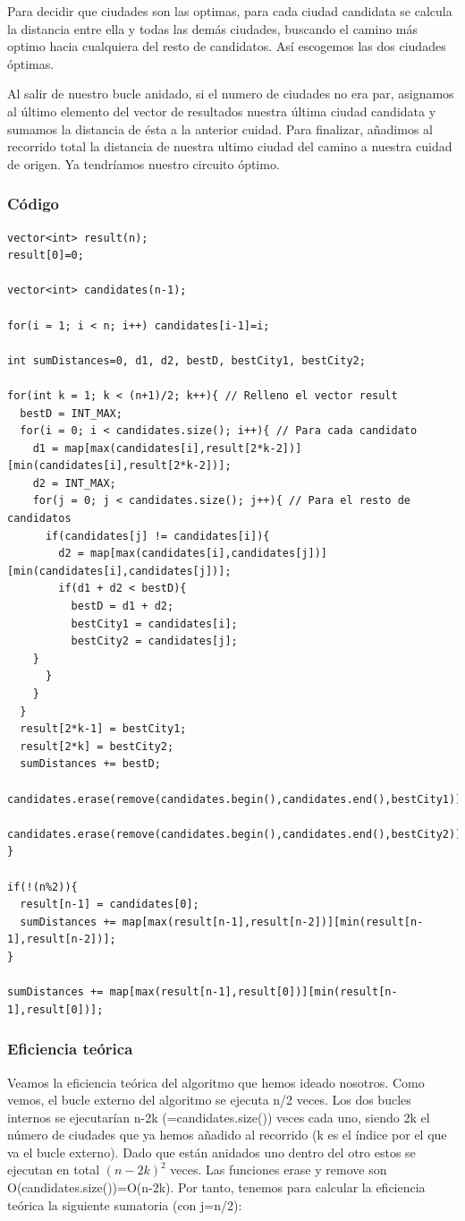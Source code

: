 \documentclass[a4]{article}
\begin{document}
Para decidir que ciudades son las optimas, para cada ciudad
candidata se calcula la distancia entre ella y todas las demás ciudades, buscando el camino más optimo hacia cualquiera del resto de candidatos. Así escogemos las dos ciudades óptimas.

Al salir de nuestro bucle anidado, si el numero de ciudades no era
par, asignamos al último elemento del vector de resultados nuestra
última ciudad candidata y sumamos la distancia de ésta a la anterior
cuidad.  Para finalizar, añadimos al recorrido total la distancia de
nuestra ultimo ciudad del camino a nuestra cuidad de origen. Ya
tendríamos nuestro circuito óptimo.

\newpage

\subsubsection{Código}

\begin{lstlisting}
vector<int> result(n);
result[0]=0;

vector<int> candidates(n-1);

for(i = 1; i < n; i++) candidates[i-1]=i;

int sumDistances=0, d1, d2, bestD, bestCity1, bestCity2;

for(int k = 1; k < (n+1)/2; k++){ // Relleno el vector result
  bestD = INT_MAX;
  for(i = 0; i < candidates.size(); i++){ // Para cada candidato
    d1 = map[max(candidates[i],result[2*k-2])][min(candidates[i],result[2*k-2])];
    d2 = INT_MAX;
    for(j = 0; j < candidates.size(); j++){ // Para el resto de candidatos
      if(candidates[j] != candidates[i]){
        d2 = map[max(candidates[i],candidates[j])][min(candidates[i],candidates[j])];
        if(d1 + d2 < bestD){
          bestD = d1 + d2;
          bestCity1 = candidates[i];
          bestCity2 = candidates[j];
	}
      }
    }
  }
  result[2*k-1] = bestCity1;
  result[2*k] = bestCity2;
  sumDistances += bestD;
  candidates.erase(remove(candidates.begin(),candidates.end(),bestCity1));
  candidates.erase(remove(candidates.begin(),candidates.end(),bestCity2));
}

if(!(n%2)){
  result[n-1] = candidates[0];
  sumDistances += map[max(result[n-1],result[n-2])][min(result[n-1],result[n-2])];
}

sumDistances += map[max(result[n-1],result[0])][min(result[n-1],result[0])];
\end{lstlisting}

\subsubsection{Eficiencia teórica}
Veamos la eficiencia teórica del algoritmo que hemos ideado
nosotros. Como vemos, el bucle externo del algoritmo se ejecuta n/2
veces. Los dos bucles internos se ejecutarían n-2k
(=candidates.size()) veces cada uno, siendo 2k el número de ciudades
que ya hemos añadido al recorrido (k es el índice por el que va el
bucle externo). Dado que están anidados uno dentro del otro estos se
ejecutan en total $(n-2k)^2$ veces. Las funciones erase y remove son
O(candidates.size())=O(n-2k). Por tanto, tenemos para calcular la
eficiencia teórica la siguiente sumatoria (con j=n/2):
\end{document}
